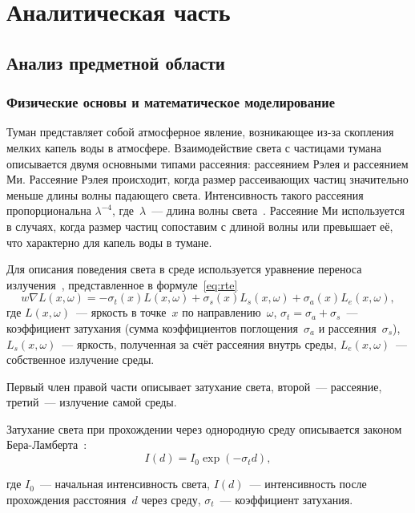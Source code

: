 \section{Аналитическая часть}
\subsection{Анализ предметной области}

\subsubsection{Физические основы и математическое моделирование}
Туман представляет собой атмосферное явление, возникающее из-за скопления мелких капель воды в атмосфере.
Взаимодействие света с частицами тумана описывается двумя основными типами рассеяния: рассеянием Рэлея и рассеянием Ми.
Рассеяние Рэлея происходит, когда размер рассеивающих частиц значительно меньше длины волны падающего света.
Интенсивность такого рассеяния пропорциональна $\lambda^{-4}$, где~$\lambda$~--- длина волны света~\cite{rayleigh-scatter}.
Рассеяние Ми используется в случаях, когда размер частиц сопоставим с длиной волны или превышает её, что характерно для капель воды в тумане.


Для описания поведения света в среде используется уравнение переноса излучения~\cite{rte-pbr}, представленное в формуле~\ref{eq:rte}
\begin{equation}
\label{eq:rte}
w \nabla L(x, \omega) = -\sigma_t(x) L(x, \omega) + \sigma_s(x) L_s(x, \omega) + \sigma_a(x) L_e(x, \omega),    
\end{equation}
где $L(x, \omega)$~--- яркость в точке~$x$ по направлению~$\omega$, $\sigma_t = \sigma_a + \sigma_s$~--- коэффициент затухания (сумма коэффициентов поглощения~$\sigma_a$ и рассеяния~$\sigma_s$), $L_s(x, \omega)$~--- яркость, полученная за счёт рассеяния внутрь среды, $L_e(x, \omega)$~--- собственное излучение среды.

Первый член правой части описывает затухание света, второй~--- рассеяние, третий~--- излучение самой среды.

Затухание света при прохождении через однородную среду описывается законом Бера-Ламберта~\cite{beer-fog}:
\begin{equation}
    \label{eq:beer-fog}
    I(d) = I_0 \exp(-\sigma_t d),
\end{equation}

где $I_0$~--- начальная интенсивность света, $I(d)$~--- интенсивность после прохождения расстояния~$d$ через среду, $\sigma_t$~--- коэффициент затухания.

